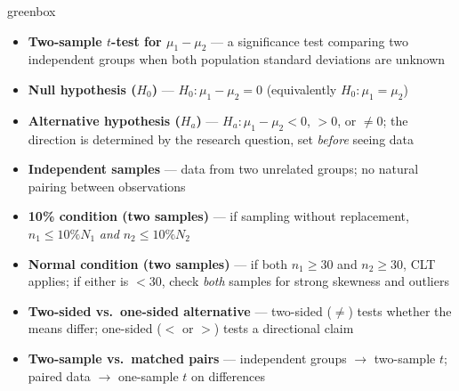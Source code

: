 \documentclass[10pt]{article}
\begin{document}
\begin{skillbox}{greenbox}
\begin{minipage}[t]{0.48\linewidth}
    \begin{itemize}
        \item \textbf{Two-sample $t$-test for $\mu_1 - \mu_2$} --- a significance test
              comparing two independent groups when both population standard deviations
              are unknown
        \item \textbf{Null hypothesis ($H_0$)} --- $H_0: \mu_1 - \mu_2 = 0$
              (equivalently $H_0: \mu_1 = \mu_2$)
        \item \textbf{Alternative hypothesis ($H_a$)} --- $H_a: \mu_1 - \mu_2 < 0$,
              $> 0$, or $\ne 0$; the direction is determined by the research question,
              set \emph{before} seeing data
        \item \textbf{Independent samples} --- data from two unrelated groups; no
              natural pairing between observations
    \end{itemize}
\end{minipage}
\hfill
\begin{minipage}[t]{0.48\linewidth}
    \begin{itemize}
        \item \textbf{10\% condition (two samples)} --- if sampling without replacement,
              $n_1 \le 10\%N_1$ \emph{and} $n_2 \le 10\%N_2$
        \item \textbf{Normal condition (two samples)} --- if both $n_1 \ge 30$ and
              $n_2 \ge 30$, CLT applies; if either is $< 30$, check \emph{both}
              samples for strong skewness and outliers
        \item \textbf{Two-sided vs.\ one-sided alternative} --- two-sided ($\ne$) tests
              whether the means differ; one-sided ($<$ or $>$) tests a directional claim
        \item \textbf{Two-sample vs.\ matched pairs} --- independent groups $\to$
              two-sample $t$; paired data $\to$ one-sample $t$ on differences
    \end{itemize}
\end{minipage}
\end{skillbox}
\end{document}
